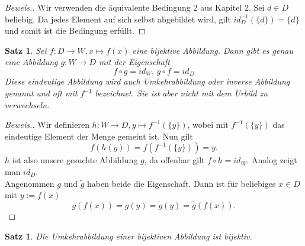 \documentclass{article}
\newtheorem{satz}[lemma]{Satz}
\newenvironment{beweis}{\begin{proof}[Beweis.]}{\end{proof}}
\numberwithin{lemma}{section}
\begin{document}
\begin{beweis}
Wir verwenden die äquivalente Bedingung 2 aus Kapitel 2. Sei $d\in D$ beliebig. Da jedes Element auf sich selbst abgebildet wird, gilt $id_D^{-1}(\{d\}) = \{d\}$ und somit ist die Bedingung erfüllt.
\end{beweis}

\begin{satz}
Sei $f: D \to W, x \mapsto f(x)$ eine bijektive Abbildung. Dann gibt es genau eine Abbildung $g: W \to D$ mit der Eigenschaft
\begin{equation*}
f \circ g = id_W,\, g \circ f = id_D
\end{equation*}
Diese eindeutige Abbildung wird auch Umkehrabbildung oder inverse Abbildung genannt und oft mit $f^{-1}$ bezeichnet. Sie ist aber nicht mit dem Urbild zu verwechseln.
\end{satz}

\begin{beweis}
Wir definieren $h: W \to D, y \mapsto f^{-1}(\{y\})$, wobei mit $f^{-1}(\{y\})$ das eindeutige Element der Menge gemeint ist. Nun gilt
\begin{equation*}
f(h(y)) = f(f^{-1}(\{y\})) = y.
\end{equation*}
$h$ ist also unsere gesuchte Abbildung $g$, da offenbar gilt $f \circ h = id_W$. Analog zeigt man $id_D$. \\
Angenommen $g$ und $\tilde{g}$ haben beide die Eigenschaft. Dann ist für beliebiges $x \in D$ mit $y := f(x)$
\begin{equation*}
g(f(x)) = g(y) = \tilde{g}(y) = \tilde{g}(f(x)).
\end{equation*}
\end{beweis}

\begin{satz}
Die Umkehrabbildung einer bijektiven Abbildung ist bijektiv.
\end{satz}
\end{document}
